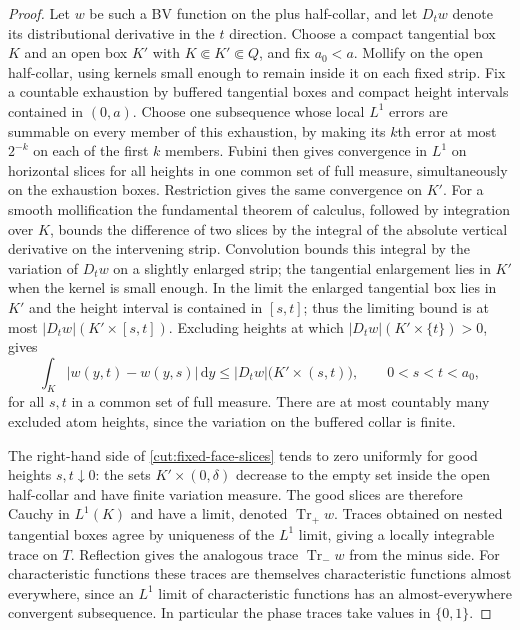 \documentclass[11pt]{article}
\numberwithin{equation}{section}
\theoremstyle{definition}
\theoremstyle{remark}
\begin{document}
\begin{proof}
Let $w$ be such a BV function on the plus half-collar, and let $D_t w$
denote its distributional derivative in the $t$ direction.
Choose a compact tangential box $K$ and an open box $K'$ with
$K\Subset K'\Subset Q$, and fix $a_0<a$.
Mollify on the open half-collar, using kernels small enough to remain
inside it on each fixed strip.  Fix a countable exhaustion by buffered
tangential boxes and compact height intervals contained in $(0,a)$.
Choose one subsequence whose local $L^1$ errors are summable on every
member of this exhaustion, by making its $k$th error at most $2^{-k}$
on each of the first $k$ members.  Fubini then gives convergence in
$L^1$ on horizontal slices for all heights in one common set of full
measure, simultaneously on the exhaustion boxes.  Restriction gives
the same convergence on $K'$.
For a smooth mollification the fundamental
theorem of calculus, followed by integration over $K$, bounds the
difference of two slices by the integral of the absolute vertical
derivative on the intervening strip.  Convolution bounds this integral
by the variation of $D_t w$ on a slightly enlarged strip; the
tangential enlargement lies in $K'$ when the kernel is small enough.
In the limit the enlarged tangential box lies in $K'$ and the height
interval is contained in $[s,t]$; thus the limiting bound is at most
$|D_t w|(K'\times[s,t])$.
Excluding heights at which
$|D_t w|(K'\times\{t\})>0$, gives
\begin{equation}\label{cut:fixed-face-slices}
 \int_K |w(y,t)-w(y,s)|\,\mathrm d y
 \le |D_t w|\bigl(K'\times(s,t)\bigr),
 \qquad 0<s<t<a_0,
\end{equation}
for all $s,t$ in a common set of full measure.
There are at most countably many excluded atom heights, since the
variation on the buffered collar is finite.

The right-hand side of \eqref{cut:fixed-face-slices} tends to zero
uniformly for good heights $s,t\downarrow0$: the sets
$K'\times(0,\delta)$ decrease to the empty set inside the open
half-collar and have finite variation measure.  The good slices are
therefore Cauchy in $L^1(K)$ and have a limit, denoted
$\operatorname{Tr}_+w$.
Traces obtained on nested tangential boxes agree by uniqueness of the
$L^1$ limit, giving a locally integrable trace on $T$.
Reflection gives the analogous trace $\operatorname{Tr}_-w$ from the
minus side.  For characteristic functions these traces are themselves
characteristic functions almost everywhere, since an $L^1$ limit of
characteristic functions has an almost-everywhere convergent
subsequence.  In particular the phase traces take values in $\{0,1\}$.


\end{proof}
\end{document}
